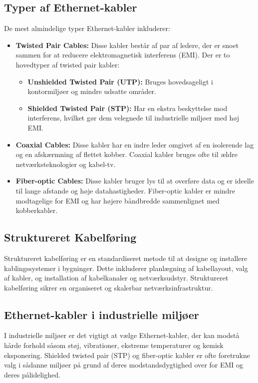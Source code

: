 \subsection{Typer af Ethernet-kabler}
De mest almindelige typer Ethernet-kabler inkluderer:
\begin{itemize}
	\item \textbf{Twisted Pair Cables:} Disse kabler består af par af ledere, der er snoet sammen for at reducere elektromagnetisk interferens (EMI). Der er to hovedtyper af twisted pair kabler:
	\begin{itemize}
		\item \textbf{Unshielded Twisted Pair (UTP):} Bruges hovedsageligt i kontormiljøer og mindre udsatte områder.
		\item \textbf{Shielded Twisted Pair (STP):} Har en ekstra beskyttelse mod interferens, hvilket gør dem velegnede til industrielle miljøer med høj EMI.
	\end{itemize}
	\item \textbf{Coaxial Cables:} Disse kabler har en indre leder omgivet af en isolerende lag og en afskærmning af flettet kobber. Coaxial kabler bruges ofte til ældre netværksteknologier og kabel-tv.
	\item \textbf{Fiber-optic Cables:} Disse kabler bruger lys til at overføre data og er ideelle til lange afstande og høje datahastigheder. Fiber-optic kabler er mindre modtagelige for EMI og har højere båndbredde sammenlignet med kobberkabler.
\end{itemize}

\subsection{Struktureret Kabelføring}
Struktureret kabelføring er en standardiseret metode til at designe og installere kablingssystemer i bygninger. Dette inkluderer planlægning af kabellayout, valg af kabler, og installation af kabelkanaler og netværksudstyr. Struktureret kabelføring sikrer en organiseret og skalerbar netværksinfrastruktur.

\subsection{Ethernet-kabler i industrielle miljøer}
I industrielle miljøer er det vigtigt at vælge Ethernet-kabler, der kan modstå hårde forhold såsom støj, vibrationer, ekstreme temperaturer og kemisk eksponering. Shielded twisted pair (STP) og fiber-optic kabler er ofte foretrukne valg i sådanne miljøer på grund af deres modstandsdygtighed over for EMI og deres pålidelighed.

